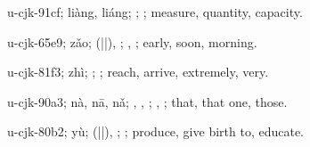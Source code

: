 \begin{multicols}{2}
{\cjkgGlue{}u-cjk-91cf; liàng, liáng; \cjkgGlue{}\cjkgGlue{}\cjkgGlue{}; \cjkgGlue{}; measure, quantity, capacity.

\cjkgGlue{}u-cjk-65e9; zǎo; \cjkgGlue{}\cjkgGlue{}(\cjkgGlue{}|\cjkgGlue{}|\cjkgGlue{}), \cjkgGlue{}; \cjkgGlue{}, \cjkgGlue{}; early, soon, morning.

\cjkgGlue{}u-cjk-81f3; zhì; \cjkgGlue{}\cjkgGlue{}\cjkgGlue{}; \cjkgGlue{}; reach, arrive, extremely, very.

\cjkgGlue{}u-cjk-90a3; nà, nā, nǎ; \cjkgGlue{}, \cjkgGlue{}, \cjkgGlue{}; \cjkgGlue{}, \cjkgGlue{}; that, that one, those.

\cjkgGlue{}u-cjk-80b2; yù; \cjkgGlue{}\cjkgGlue{}(\cjkgGlue{}|\cjkgGlue{}|\cjkgGlue{}), \cjkgGlue{}\cjkgGlue{}\cjkgGlue{}; \cjkgGlue{}; produce, give birth to, educate.

}
\end{multicols}
